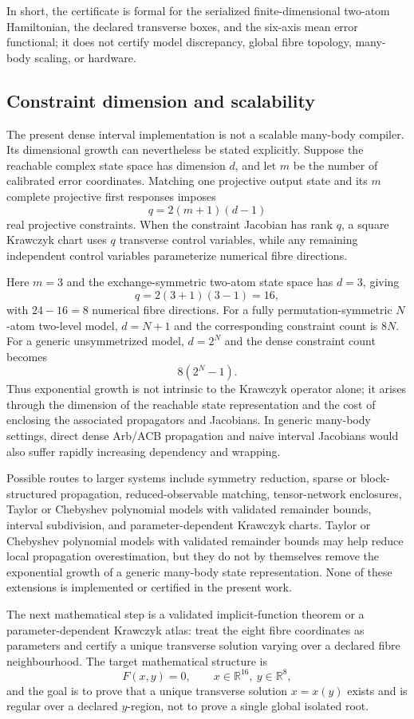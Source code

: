 \documentclass[11pt]{article}
\newcommand{\R}{\mathbb{R}}
\begin{document}
In short, the certificate is formal for the serialized finite-dimensional two-atom Hamiltonian, the declared transverse boxes, and the six-axis mean error functional; it does not certify model discrepancy, global fibre topology, many-body scaling, or hardware.

\subsection{Constraint dimension and scalability}

The present dense interval implementation is not a scalable many-body
compiler. Its dimensional growth can nevertheless be stated explicitly.
Suppose the reachable complex state space has dimension $d$, and let $m$ be
the number of calibrated error coordinates. Matching one projective output
state and its $m$ complete projective first responses imposes
\[
q=2(m+1)(d-1)
\]
real projective constraints. When the constraint Jacobian has rank $q$, a
square Krawczyk chart uses $q$ transverse control variables, while any
remaining independent control variables parameterize numerical fibre
directions.

Here $m=3$ and the exchange-symmetric two-atom state space has $d=3$, giving
\[
q=2(3+1)(3-1)=16,
\]
with $24-16=8$ numerical fibre directions. For a fully permutation-symmetric
$N$-atom two-level model, $d=N+1$ and the corresponding constraint count is
$8N$. For a generic unsymmetrized model, $d=2^N$ and the dense constraint
count becomes
\[
8(2^N-1).
\]
Thus exponential growth is not intrinsic to the Krawczyk operator alone; it
arises through the dimension of the reachable state representation and the
cost of enclosing the associated propagators and Jacobians. In generic
many-body settings, direct dense Arb/ACB propagation and naive interval
Jacobians would also suffer rapidly increasing dependency and wrapping.

Possible routes to larger systems include symmetry reduction, sparse or
block-structured propagation, reduced-observable matching, tensor-network
enclosures, Taylor or Chebyshev polynomial models with validated remainder
bounds, interval subdivision, and parameter-dependent Krawczyk charts.
Taylor or Chebyshev polynomial models with validated remainder bounds may
help reduce local propagation overestimation, but they do not by themselves
remove the exponential growth of a generic many-body state representation.
None of these extensions is implemented or certified in the present work.

The next mathematical step is a validated implicit-function theorem or a parameter-dependent Krawczyk atlas: treat the eight fibre coordinates as parameters and certify a unique transverse solution varying over a declared fibre neighbourhood. The target mathematical structure is
\[
F(x,y)=0,\qquad x\in\R^{16},\ y\in\R^8,
\]
and the goal is to prove that a unique transverse solution $x=x(y)$ exists and is regular over a declared $y$-region, not to prove a single global isolated root.
\end{document}
